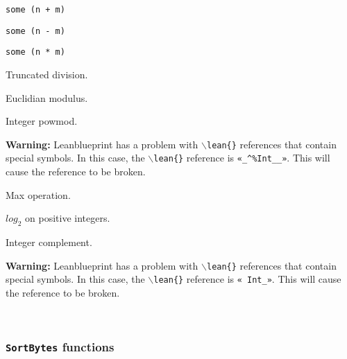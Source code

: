 \begin{definition}[+Int]\label{def:+Int}\leanok{}
\texttt{some (n + m)}
\end{definition}
\begin{definition}[-Int]\label{def:-Int}\leanok{}
\texttt{some (n - m)}
\end{definition}
\begin{definition}[*Int]\label{def:*Int}\leanok{}
\texttt{some (n * m)}
\end{definition}
\begin{definition}[/Int]\label{def:/Int}\leanok{}
Truncated division.
\end{definition}
\begin{definition}[modInt]\label{def:modInt}\leanok{}
Euclidian modulus.
\end{definition}
\begin{definition}[powModInt]\label{powModInt}\leanok{}
Integer powmod.

\textbf{Warning:} Leanblueprint has a problem with \texttt{$\backslash$lean\{\}}
references that contain special symbols. In this case, the \texttt{$\backslash$lean\{\}}
reference is \texttt{«_^\%Int__»}. This will cause the reference to be broken.
\end{definition}
\begin{definition}[maxInt]\label{maxInt}\leanok{}
Max operation.
\end{definition}
\begin{definition}\label{log2Int}\leanok{}
$log_2$ on positive integers.
\end{definition}
\begin{definition}[notInt]\label{notInt}\leanok{}
Integer complement.

\textbf{Warning:} Leanblueprint has a problem with \texttt{$\backslash$lean\{\}}
references that contain special symbols. In this case, the \texttt{$\backslash$lean\{\}}
reference is \texttt{«~Int_»}. This will cause the reference to be broken.
\end{definition}

\\
\subsubsection{\texttt{SortBytes} functions}

